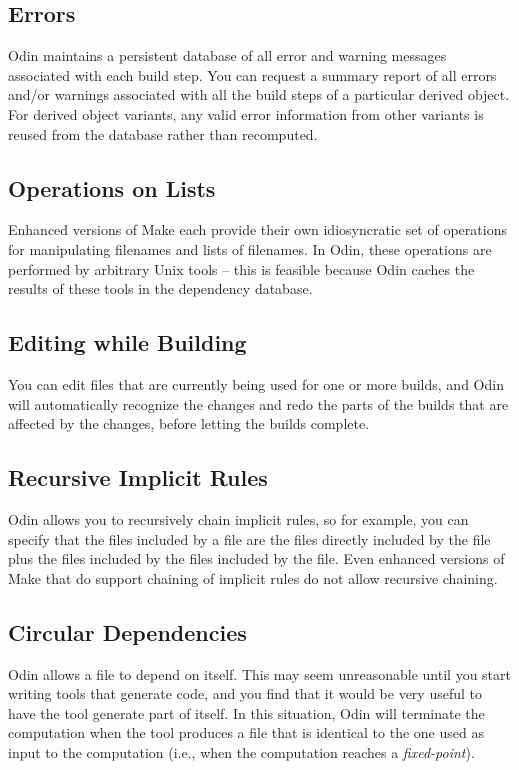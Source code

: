 \subsection{Errors}
Odin maintains a persistent database of all error and warning messages
associated with each build step.
You can request a summary report of all errors and/or warnings
associated with all the build steps of a particular derived object.
For derived object variants,
any valid error information from other variants is reused from the
database rather than recomputed.

\subsection{Operations on Lists}
Enhanced versions of Make each provide their own idiosyncratic
set of operations for manipulating filenames and lists of filenames.
In Odin, these operations are performed by arbitrary Unix tools --
this is feasible because Odin caches the results of these tools in
the dependency database.

\subsection{Editing while Building}
You can edit files that are currently being used for one or more builds,
and Odin will automatically recognize the changes and redo the parts of
the builds that are affected by the changes,
before letting the builds complete.

\subsection{Recursive Implicit Rules}
Odin allows you to recursively chain implicit rules,
so for example, you can specify that the files included by
a file are the files directly included by the file
plus the files included by the files included by the file.
Even enhanced versions of Make that do support chaining
of implicit rules do not allow recursive chaining.

\subsection{Circular Dependencies}
Odin allows a file to depend on itself.
This may seem unreasonable until you start writing tools that generate code,
and you find that it would be very useful to have the tool generate part
of itself.
In this situation,
Odin will terminate the computation when the tool produces a file that
is identical to the one used as input to the computation
(i.e., when the computation reaches a {\em fixed-point}).

